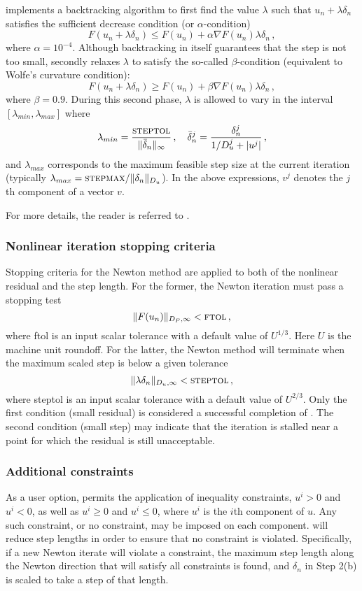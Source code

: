 {\kinsol} implements a backtracking algorithm to first find
the value $\lambda$ such that $u_n + \lambda \delta_n$
satisfies the sufficient decrease condition (or $\alpha$-condition)
\[
F(u_n + \lambda\delta_n) \le F(u_n) + \alpha \nabla F(u_n) \lambda\delta_n \, ,
\]
where $\alpha = 10^{-4}$.
Although backtracking in itself guarantees that the step is not too small,
{\kinsol} secondly relaxes $\lambda$ to satisfy the so-called $\beta$-condition
(equivalent to Wolfe's curvature condition):
\[
F(u_n + \lambda\delta_n) \ge F(u_n) + \beta \nabla F(u_n) \lambda\delta_n \, ,
\]
where $\beta = 0.9$. During this second phase, $\lambda$ is allowed to
vary in the interval $[\lambda_{min} , \lambda_{max}]$ where
\[
\lambda_{min} =  \frac{\mbox{\sc steptol}}{\| \bar\delta_n\|_{\infty}} \, , \quad
\bar\delta_n^j = \frac{\delta_n^j}{1/D_u^j + |u^j|} \, ,
\]
and $\lambda_{max}$ corresponds to the maximum feasible step size at the
current iteration (typically $\lambda_{max} = \mbox{\sc stepmax} / \|\delta_n\|_{D_u}$).
In the above expressions, $v^j$ denotes the $j$th component of a vector $v$.

For more details, the reader is referred to \cite{DeSc:96}.


\subsubsection*{Nonlinear iteration stopping criteria}
Stopping criteria for the Newton method are applied to
both of the nonlinear residual and the step length.  For the
former, the Newton iteration must pass a stopping test
\[ \|F(u_n)\|_{D_F,\infty} < \mbox{\sc ftol} \, , \]
where {\sc ftol} is an input scalar tolerance with a default value
of $U^{1/3}$.  Here $U$ is the machine unit roundoff.
For the latter, the Newton method will terminate
when the maximum scaled step is below a given tolerance
\[ \|\lambda\delta_n\|_{D_u,\infty} < \mbox{\sc steptol} \, , \]
where {\sc steptol} is an input scalar tolerance with a default
value of $U^{2/3}$.  Only the first condition (small residual)
is considered a successful completion of {\kinsol}.  The second
condition (small step) may indicate that the iteration is stalled
near a point for which the residual is still unacceptable.


\subsubsection*{Additional constraints}
As a user option, {\kinsol} permits the application of inequality
constraints, $u^i > 0$ and $u^i < 0$, as well as $u^i \geq 0$ and
$u^i \leq 0$, where $u^i$ is the $i$th component of $u$.  Any such
constraint, or no constraint, may be imposed on each component.
{\kinsol} will reduce step lengths in order to ensure that no
constraint is violated.  Specifically, if a new Newton iterate
will violate a constraint, the maximum step length along
the Newton direction that will satisfy all constraints is found,
and $\delta_n$ in Step 2(b) is scaled to take a step of that length.

